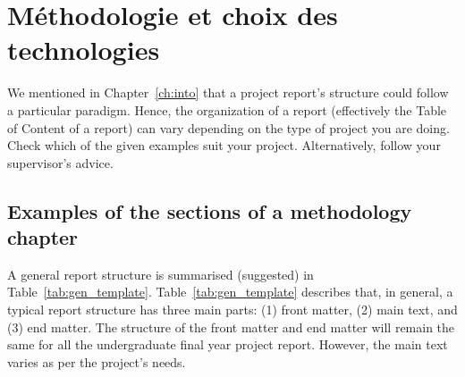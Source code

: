 \chapter{Méthodologie et choix des technologies}
\label{ch:method} %

We mentioned in Chapter~\ref{ch:into} %
that a project report's structure could follow a particular paradigm. Hence, the organization of a report (effectively the Table of Content of a report) can vary depending on the type of project you are doing. Check which of the given examples suit your project. Alternatively, follow your supervisor's advice.

\section{Examples of the sections of a methodology chapter}
A general report structure is summarised (suggested) in Table~\ref{tab:gen_template}. Table~\ref{tab:gen_template} describes that, in general, a typical report structure has three main parts: (1) front matter, (2) main text, and (3) end matter. %
The structure of the front matter and end matter will remain the same for all the undergraduate final year project report. However, the main text varies as per the project's needs.
